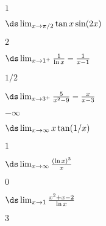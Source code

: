 \begin{multicols}{2}[]
\begin{enumialphparenastyle}
\begin{ex}
\begin{sol}
  {$1$}
\end{sol}

\end{ex}

\begin{ex} 
{$\ds \lim_{x\to \pi/2} \tan x\sin (2x)$}
 
\begin{sol}
 {$2$}
\end{sol}

\end{ex}

\begin{ex} 
{$\ds \lim_{x\to 1^+} \frac{1}{\ln x} - \frac{1}{x-1}$}

\begin{sol}
{$1/2$}  
\end{sol}

\end{ex}

\begin{ex} 
 {$\ds \lim_{x\to 3^+} \frac{5}{x^2-9} - \frac{x}{x-3}$}
 
\begin{sol}
{$-\infty$} 
\end{sol}

\end{ex}

\begin{ex} 
{$\ds \lim_{x\to \infty} x\tan (1/x)$}

\begin{sol}
{$1$}  
\end{sol}

\end{ex}

\begin{ex} 
{$\ds \lim_{x\to \infty} \frac{(\ln x)^3}{x}$}
 
\begin{sol}
{$0$} 
\end{sol}

\end{ex}

\begin{ex} 
 {$\ds \lim_{x\to 1} \frac{x^2+x-2}{\ln x}$}

\begin{sol}
  {$3$}
\end{sol}

\end{ex}


\end{enumialphparenastyle}
\end{multicols}
